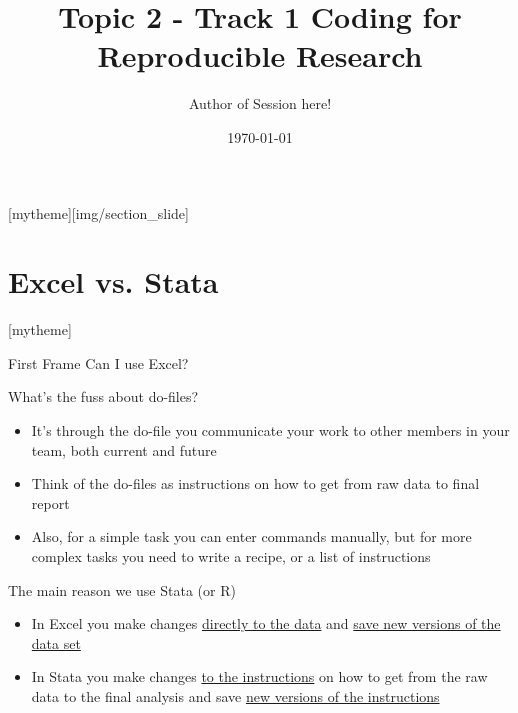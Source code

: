 \documentclass[aspectratio=169]{beamer}
\title{Topic 2 - Track 1 \newline Coding for Reproducible Research}
\date{\today}
\author{Author of Session here!} %
\institute{Development Impact Evaluation (DIME) \newline The World Bank }
\newcommand{\sectionpic}[2]{
	\setbeamertemplate{section page}[mytheme][#2]
	\section{#1}
	\setbeamertemplate{section page}[mytheme]
}
\begin{document}
	
{
	\maketitle
}

\sectionpic{Excel vs. Stata}{img/section_slide}


\begin{frame}{First Frame}
Can I use Excel? \newline
\end{frame}


\begin{frame}{What's the fuss about do-files?}

\begin{itemize}
	\item It’s through the do-file you communicate your work to other members in your team, both current and future

	\item Think of the do-files as instructions on how to get from raw data to final report

	\item Also, for a simple task you can enter commands manually, but for more complex tasks you need to write a recipe, or a list of instructions

\end{itemize}
\end{frame}

\begin{frame}{The main reason we use Stata (or R)}
\begin{itemize}
	
	\item In Excel you make changes \underline{directly to the data} and \underline{save new versions of the data set}

	\item In Stata you make changes \underline{to the instructions} on how to get from the raw data to the final analysis and save \underline{new versions of the instructions}
\end{itemize}
\end{frame}
\end{document}
